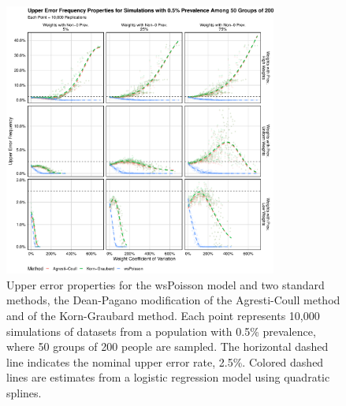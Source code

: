 \begin{figure}
\centering
\includegraphics[width=0.8\textwidth]{perfect_upper_error_frequency_50_groups_0_005_prev}
\caption{Upper error properties for the wsPoisson model and two standard methods, the Dean-Pagano modification of the Agresti-Coull method and of the Korn-Graubard method.
Each point represents 10,000 simulations of datasets from a population with 0.5\% prevalence, where 50 groups of 200 people are sampled.
The horizontal dashed line indicates the nominal upper error rate, 2.5\%.
Colored dashed lines are estimates from a logistic regression model using quadratic splines.}
\label{ch_3:fig:perfect_upper_error_frequency_50_groups_0_005_prev}
\end{figure}

